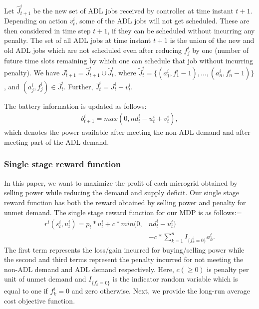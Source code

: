  Let $\widehat J_{t+1}^{i}$ be the new set of ADL jobs received by controller at time instant $t+1$. Depending on action $v_{t}^{i}$, some of the ADL jobs will not get scheduled. These are then considered in time step $t+1$, if they can be scheduled without incurring any penalty. The set of all ADL jobs at time instant $t+1$ is the union of the new and old ADL jobs which are not scheduled even after reducing $f_{j}^{i}$ by one (number of future time slots remaining by which one can schedule that job without incurring penalty).
We have $J_{t+1}^{i} = \widehat J_{t+1}^{i} \cup \widetilde J_{t}^{i}$, where $\widetilde J_{t}^{i} =  \{(a_{1}^{i}, f_{1}^{i} - 1),\ldots,(a_{n}^{i}, f_{n}^{i} - 1)\}$, and $ (a_{j}^{i}, f_{j}^{i}) \in \overline J_{t}^{i}$. Further, $\overline J_{t}^{i} = J_{t}^{i} - v_{t}^{i}$.

The battery information is updated as follows:
\begin{align}
b_{t+1}^{i} = max(0,nd_{t}^{i} - u_{t}^{i} + v_{t}^{i}),
\end{align}
which denotes the power available after meeting the non-ADL demand and after meeting part of the ADL demand.
\subsubsection{Single stage reward function}
In this paper, we want to maximize the profit of each microgrid obtained by selling power while reducing the demand and supply deficit. Our single stage reward function has both the reward obtained by selling power and penalty for unmet demand. The single stage reward  function for our MDP is as follows:=
\begin{align}
r^{i}(s_t^i,u_t^i) = p_{t}*u_{t}^{i} + c*min(0,&nd_{t}^{i} - u_{t}^{i})  \nonumber\\ & - c* \sum_{k =1}^{n} I_{\{f_{k}^{i} = 0\}} a_{k}^{i} .
\end{align}
The first term represents the loss/gain incurred for  buying/selling  power while the second and third terms represent the penalty  incurred for not meeting the non-ADL demand and ADL demand respectively. Here, $c (\ge 0)$ is penalty per unit of unmet demand and $I_{\{f_{k}^{i} = 0\}}$ is the indicator random variable which is equal to one if $f_{k}^{i} =0$ and zero otherwise. 
Next, we provide the long-run average cost objective function. 
